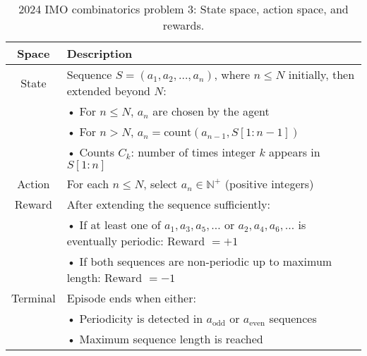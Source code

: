 \begin{table}[htb]
\caption{2024 IMO combinatorics problem 3: State space, action space, and rewards.}
  \centering
  \small
\begin{tabular}{cl}
  \toprule
  Space    & Description \\
  \midrule
  State    & Sequence \( S = (a_1, a_2, \ldots, a_n) \), where \( n \leq N \) initially, then extended beyond \( N \): \\
           & • For \( n \leq N \), \( a_n \) are chosen by the agent \\
           & • For \( n > N \), \( a_n = \text{count}(a_{n-1}, S[1 : n - 1]) \) \\
           & • Counts \( C_k \): number of times integer \( k \) appears in \( S[1 : n] \) \\
  Action   & For each \( n \leq N \), select \( a_n \in \mathbb{N}^+ \) (positive integers) \\
  Reward   & After extending the sequence sufficiently: \\
           & • If at least one of \( a_1, a_3, a_5, \ldots \) or \( a_2, a_4, a_6, \ldots \) is eventually periodic: Reward \( = +1 \) \\
           & • If both sequences are non-periodic up to maximum length: Reward \( = -1 \) \\
  Terminal & Episode ends when either: \\
           & • Periodicity is detected in \( a_{\text{odd}} \) or \( a_{\text{even}} \) sequences \\
           & • Maximum sequence length is reached \\
  \bottomrule
\end{tabular} 
\end{table}

